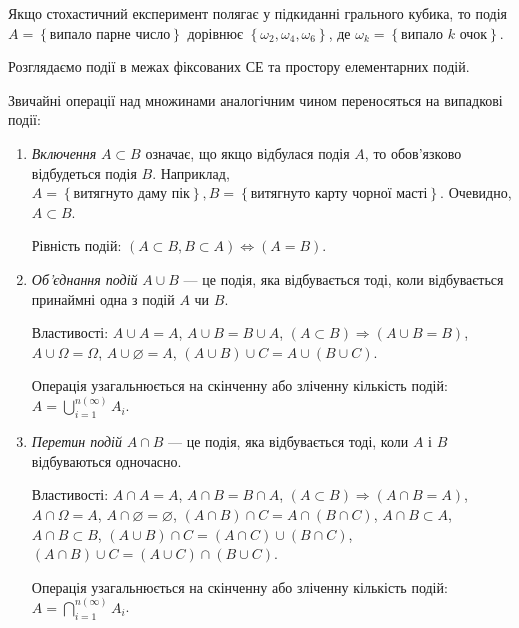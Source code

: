 \begin{example}
    Якщо стохастичний експеримент полягає у підкиданні грального кубика,
    то подія $A = \left\{\text{випало парне число}\right\}$ дорівнює $\left\{\omega_2, \omega_4, \omega_6\right\}$, де
    $\omega_k = \left\{\text{випало } k \text{ очок}\right\}$.
\end{example}

\begin{remark}
    Розглядаємо події в межах фіксованих СЕ та простору елементарних подій.
\end{remark}
Звичайні операції над множинами аналогічним чином переносяться на випадкові події:
\begin{enumerate}
    \item \emph{Включення} $A \subset B$ означає, що якщо відбулася подія $A$, то обов'язково відбудеться подія $B$.
    Наприклад, $A = \left\{\text{витягнуто даму пік}\right\}, B = \left\{\text{витягнуто карту чорної масті}\right\}$. 
    Очевидно, $A\subset B$.

    Рівність подій: $\left( A \subset B, B \subset A \right) \iff \left( A = B\right)$.
    \item \emph{Об'єднання подій} $A \cup B$ --- це подія, яка відбувається тоді, коли відбувається
    принаймні одна з подій $A$ чи $B$.

    Властивості: $A \cup A = A$,  $A \cup B = B \cup A$, $\left( A \subset B \right) \Rightarrow \left( A \cup B = B \right)$, 
    $A \cup \Omega = \Omega$, $A \cup \varnothing = A$, $\left( A \cup B \right) \cup C = A \cup \left( B \cup C \right)$.

    Операція узагальнюється на скінченну або зліченну кількість подій: $A = \bigcup\limits_{i=1}^{n \left( \infty \right)} A_i$.
    \item \emph{Перетин подій} $A \cap B$ --- це подія, яка відбувається тоді, коли $A$ і $B$ відбуваються одночасно.

    Властивості: $A \cap A = A$,  $A \cap B = B \cap A$, $\left( A \subset B \right) \Rightarrow \left( A \cap B = A \right)$, 
    $A \cap \Omega = A$, $A \cap \varnothing = \varnothing$, $\left( A \cap B \right) \cap C = A \cap \left( B \cap C \right)$,
    $A \cap B \subset A$, $A \cap B \subset B$, $\left( A \cup B \right) \cap C = \left( A \cap C \right) \cup \left( B \cap C \right)$,
    $\left( A \cap B \right) \cup C = \left( A \cup C \right) \cap \left( B \cup C \right)$.

    Операція узагальнюється на скінченну або зліченну кількість подій: $A = \bigcap\limits_{i=1}^{n \left( \infty \right)} A_i$.
\end{enumerate}

